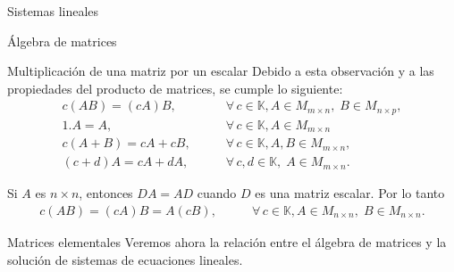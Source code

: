 \documentclass[a4paper,12pt,twoside,spanish]{amsbook}
\theoremstyle{definition}
\theoremstyle{remark}
\newcommand{\K}{\mathbb K}
\begin{document}
\begin{chapter}{Sistemas lineales}
\begin{section}{Álgebra de matrices}
\begin{subsection}{Multiplicación de una matriz por un escalar}
		Debido a esta observación y a las propiedades del producto de matrices, se cumple lo siguiente:
			\begin{align*}
			 c(A B) = (cA) B,\qquad &\forall\, c \in \K,  A \in M_{m \times n}, \;B \in M_{n \times p}, \\
			1.A = A ,\qquad&\forall\, c \in \K, A \in M_{m \times n}\\
			c(A + B) = cA + cB,\qquad& \forall\, c \in \K, A,B \in M_{m \times n}, \\
			(c+ d)A = cA + dA,\qquad& \forall\, c,d \in \K, \; A \in M_{m \times n}.
			\end{align*}
			
			Si $A$ es $n \times n$,  entonces $DA = AD$ cuando $D$  es una matriz escalar. Por lo tanto
			\begin{align*}
			c(A B) = (cA) B = A(cB),\qquad &\forall\, c \in \K,  A \in M_{n \times n}, \;B \in M_{n \times n}.
			\end{align*} 

		\end{subsection}
			
			
		\end{section}
		
		\begin{section}{Matrices elementales}
			Veremos ahora la relación entre el álgebra de matrices y la solución de sistemas de ecuaciones lineales. 
			

\end{section}
\end{chapter}
\end{document}
